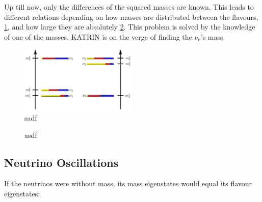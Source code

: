     Up till now, only the differences of the squared masses are known. This leads to different relations depending on how masses are distributed between the flavours, \ref{fig:massSchemes}, and how large they are absolutely \ref{fig:massHierarchy}. This problem is solved by the knowledge of one of the masses. KATRIN is on the verge of finding the $\nu_e$'s mass.\cite{becker2008a}
    
    \begin{figure}
    \centering
    \includegraphics[width=0.5\textwidth]{graphics/standardModel/massHierarchy.jpg}
    	\caption{sadf\cite{neutrinoMassScheme}}
    	\label{fig:massSchemes}
    \end{figure}
    \begin{figure}
    \caption{asdf}
    	\label{fig:massHierarchy}
    \end{figure}

    
    \subsection{Neutrino Oscillations}
    \label{ch:Introduction:sec:Massive neutrino:subsec:neutrino Oscillations}
      If the neutrinos were without mass, its mass eigenstates would equal its flavour eigenstates:
      
